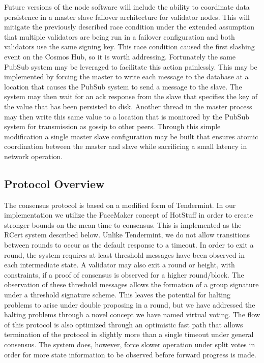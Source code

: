Future versions of the node software will include the ability to
coordinate data persistence in a master slave failover architecture for
validator nodes.
This will mitigate the previously described race condition under the
extended assumption that multiple validators are being run in a
failover configuration and both validators use the same signing key.
This race condition caused the first slashing event on the Cosmos Hub,
so it is worth addressing.
Fortunately the same PubSub system may be leveraged to facilitate this
action painlessly.
This may be implemented by forcing the master to write each message to
the database at a location that causes the PubSub system to send a
message to the slave.
The system may then wait for an ack response from the slave that
specifies the key of the value that has been persisted to disk.
Another thread in the master process may then write this same value to
a location that is monitored by the PubSub system for transmission as
gossip to other peers.
Through this simple modification a single master slave configuration
may be built that ensures atomic coordination between the master and
slave while sacrificing a small latency in network operation.


\subsection{Protocol Overview}

The \LayerTwoLong{} consensus protocol is based on a modified form of
Tendermint.
In our implementation we utilize the PaceMaker concept of HotStuff in
order to create stronger bounds on the mean time to consensus.
This is implemented as the RCert system described below.
Unlike Tendermint, we do not allow transitions between rounds to occur
as the default response to a timeout.
In order to exit a round, the system requires at least threshold
messages have been observed in each intermediate state.
A validator may also exit a round or height, with constraints, if a
proof of consensus is observed for a higher round/block.
The observation of these threshold messages allows the formation of a
group signature under a threshold signature scheme.
This leaves the potential for halting problems to arise under double
proposing in a round, but we have addressed the halting problems
through a novel concept we have named virtual voting.
The flow of this protocol is also optimized through an optimistic fast
path that allows termination of the protocol in slightly more than a
single timeout under general consensus.
The system does, however, force slower operation under split votes in
order for more state information to be observed before forward progress
is made.

